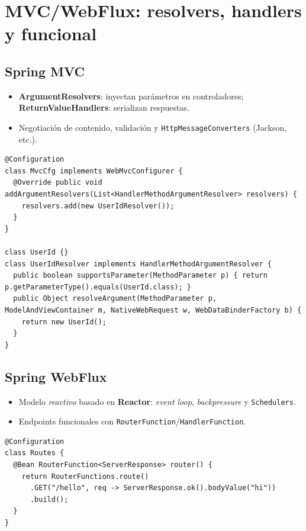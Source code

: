 \documentclass[11pt,a4paper]{article}
\begin{document}
\section{MVC/WebFlux: resolvers, handlers y funcional}
\subsection{Spring MVC}
\begin{itemize}[leftmargin=*]
  \item \textbf{ArgumentResolvers}: inyectan parámetros en controladores; \textbf{ReturnValueHandlers}: serializan respuestas.
  \item Negotiación de contenido, validación y \texttt{HttpMessageConverters} (Jackson, etc.).
\end{itemize}

\begin{lstlisting}[style=javastyle, caption={ArgumentResolver personalizado}]
@Configuration
class MvcCfg implements WebMvcConfigurer {
  @Override public void addArgumentResolvers(List<HandlerMethodArgumentResolver> resolvers) {
    resolvers.add(new UserIdResolver());
  }
}

class UserId {}
class UserIdResolver implements HandlerMethodArgumentResolver {
  public boolean supportsParameter(MethodParameter p) { return p.getParameterType().equals(UserId.class); }
  public Object resolveArgument(MethodParameter p, ModelAndViewContainer m, NativeWebRequest w, WebDataBinderFactory b) {
    return new UserId();
  }
}
\end{lstlisting}

\subsection{Spring WebFlux}
\begin{itemize}[leftmargin=*]
  \item Modelo \emph{reactivo} basado en \textbf{Reactor}: \emph{event loop}, \emph{backpressure} y \texttt{Schedulers}.
  \item Endpoints funcionales con \texttt{RouterFunction}/\texttt{HandlerFunction}.
\end{itemize}

\begin{lstlisting}[style=javastyle, caption={Router funcional en WebFlux}] 
@Configuration
class Routes {
  @Bean RouterFunction<ServerResponse> router() {
    return RouterFunctions.route()
      .GET("/hello", req -> ServerResponse.ok().bodyValue("hi"))
      .build();
  }
}
\end{lstlisting}
\end{document}
